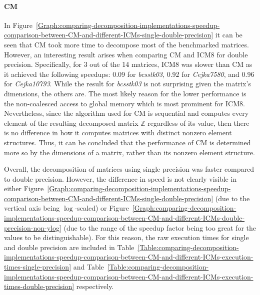 \paragraph{CM}\label{Paragraph:comparing-decomposition-implementations-speedup-comparison-between-CM-and-different-ICMs-CM-speedup-description}
In Figure~\ref{Graph:comparing-decomposition-implementations-speedup-comparison-between-CM-and-different-ICMs-single-double-precision} it can be seen that CM took more time to decompose most of the benchmarked matrices. However, an interesting result arises when comparing CM and ICM8 for double precision. Specifically, for 3 out of the 14 matrices, ICM8 was slower than CM as it achieved the following speedups: 0.09 for \textit{bcsstk03}, 0.92 for \textit{Cejka7580}, and 0.96 for \textit{Cejka10793}. While the result for \textit{bcsstk03} is not surprising given the matrix's dimensions, the others are. The most likely reason for the lower performance is the non-coalesced access to global memory which is most prominent for ICM8. \\
Nevertheless, since the algorithm used for CM is sequential and computes every element of the resulting decomposed matrix $ \mathbb{Z} $ regardless of its value, then there is no difference in how it computes matrices with distinct nonzero element structures. Thus, it can be concluded that the performance of CM is determined more so by the dimensions of a matrix, rather than its nonzero element structure.
\par Overall, the decomposition of matrices using single precision was faster compared to double precision. However, the difference in speed is not clearly visible in either Figure~\ref{Graph:comparing-decomposition-implementations-speedup-comparison-between-CM-and-different-ICMs-single-double-precision} (due to the vertical axis being $ \log $-scaled) or Figure~\ref{Graph:comparing-decomposition-implementations-speedup-comparison-between-CM-and-different-ICMs-double-precision-non-ylog} (due to the range of the speedup factor being too great for the values to be distinguishable). For this reason, the raw execution times for single and double precision are included in Table~\ref{Table:comparing-decomposition-implementations-speedup-comparison-between-CM-and-different-ICMs-execution-times-single-precision} and Table~\ref{Table:comparing-decomposition-implementations-speedup-comparison-between-CM-and-different-ICMs-execution-times-double-precision} respectively.

